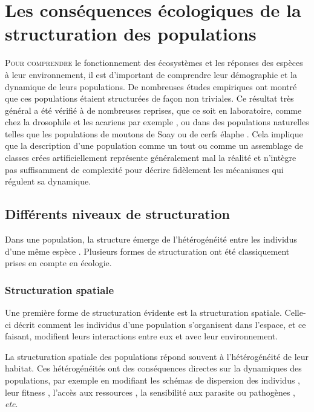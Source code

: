 \section{Les conséquences écologiques de la
structuration des populations}

\lettrine[lines=3]{P}{our comprendre} le fonctionnement des écosystèmes et les
réponses des espèces à leur environnement, il est d'important de comprendre leur démographie et la
dynamique de leurs populations. De nombreuses études empiriques ont montré que
ces populations étaient structurées de façon non triviales. Ce 
résultat très général a été vérifié à de nombreuses reprises, que ce soit en
laboratoire, comme chez la drosophile \autocites{madalena1974a} et les acariens
par exemple \autocites{benton2005a}, ou dans des populations naturelles telles que les populations de
moutons de Soay \autocites{coulson2001a,ozgul2009a} ou de cerfs élaphe \autocites{langvatn1999a}. 
Cela implique que la description d'une population comme un tout ou comme
un assemblage de classes crées artificiellement représente généralement mal la
réalité et n'intègre pas suffisamment de complexité pour décrire fidèlement les
mécanismes qui régulent sa dynamique.

\subsection{Différents niveaux de structuration}

Dans une population, la structure émerge de l'hétérogénéité entre les
individus d'une même espèce \autocites{benton2006a}. Plusieurs formes de
structuration ont été classiquement prises en compte en écologie.

\subsubsection{Structuration spatiale}

Une première forme de structuration évidente est la structuration spatiale.
Celle-ci décrit comment les individus d'une population s'organisent dans
l'espace, et ce faisant, modifient leurs interactions entre eux et avec leur environnement. 

La structuration spatiale des populations répond souvent à l'hétérogénéité de
leur habitat. Ces hétérogénéités ont des conséquences directes sur la dynamiques
des populations, par exemple en modifiant les schémas de dispersion des
individus \autocites{hiebeler2000a}, leur fitness \autocites{zajkac2008a},
l'accès aux ressources \autocites{burger2008a}, la sensibilité aux parasite ou
pathogènes \autocites{su2009a}, \textit{etc}.

